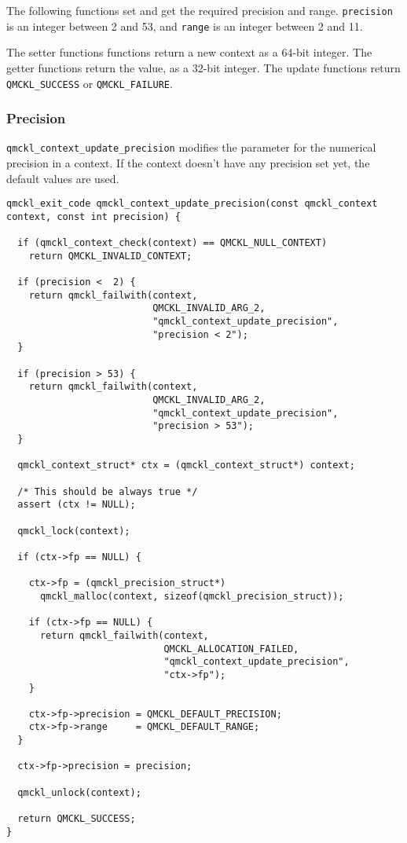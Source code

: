 The following functions set and get the required precision and
range. \texttt{precision} is an integer between 2 and 53, and \texttt{range} is an
integer between 2 and 11.

The setter functions functions return a new context as a 64-bit
integer. The getter functions return the value, as a 32-bit
integer. The update functions return \texttt{QMCKL\_SUCCESS} or
\texttt{QMCKL\_FAILURE}.

\subsubsection{Precision}
\label{sec:org6cf253c}
\texttt{qmckl\_context\_update\_precision} modifies the parameter for the
numerical precision in a context. If the context doesn't have any
precision set yet, the default values are used.

\begin{verbatim}
qmckl_exit_code qmckl_context_update_precision(const qmckl_context context, const int precision) {

  if (qmckl_context_check(context) == QMCKL_NULL_CONTEXT)
    return QMCKL_INVALID_CONTEXT;

  if (precision <  2) {
    return qmckl_failwith(context,
                          QMCKL_INVALID_ARG_2,
                          "qmckl_context_update_precision",
                          "precision < 2");
  }

  if (precision > 53) {
    return qmckl_failwith(context,
                          QMCKL_INVALID_ARG_2,
                          "qmckl_context_update_precision",
                          "precision > 53");
  }

  qmckl_context_struct* ctx = (qmckl_context_struct*) context;

  /* This should be always true */
  assert (ctx != NULL);

  qmckl_lock(context);

  if (ctx->fp == NULL) {

    ctx->fp = (qmckl_precision_struct*)
      qmckl_malloc(context, sizeof(qmckl_precision_struct));

    if (ctx->fp == NULL) {
      return qmckl_failwith(context,
                            QMCKL_ALLOCATION_FAILED,
                            "qmckl_context_update_precision",
                            "ctx->fp");
    }

    ctx->fp->precision = QMCKL_DEFAULT_PRECISION;
    ctx->fp->range     = QMCKL_DEFAULT_RANGE;
  }

  ctx->fp->precision = precision;

  qmckl_unlock(context);

  return QMCKL_SUCCESS;
}
\end{verbatim}

